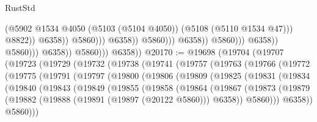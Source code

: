 \begin{lexlean}{RustStd}
\begin{coremodule}
                                                              (@5902
                                                                @1534
                                                                @4050
                                                                (@5103 (@5104 @4050))
                                                                (@5108 (@5110 @1534 @47)))
                                                              @8822))
                                                          @6358))
                                                      @5860)))
                                                @6358))
                                            @5860)))
                                      @6358))
                                  @5860)))
                            @6358))
                        @5860)))
                  @6358))
              @5860)))
        @6358))
@20170 := @19698
    (@19704
      (@19707
        (@19723
          (@19729
            (@19732
              (@19738
                (@19741
                  (@19757
                    (@19763
                      (@19766
                        (@19772
                          (@19775
                            (@19791
                              (@19797
                                (@19800
                                  (@19806
                                    (@19809
                                      (@19825
                                        (@19831
                                          (@19834
                                            (@19840
                                              (@19843
                                                (@19849
                                                  (@19855
                                                    (@19858
                                                      (@19864
                                                        (@19867
                                                          (@19873
                                                            (@19879
                                                              (@19882
                                                                (@19888
                                                                  (@19891 (@19897 (@20122 @5860)))
                                                                  @6358))
                                                              @5860)))
                                                        @6358))
                                                    @5860)))

\end{coremodule}
\end{lexlean}
